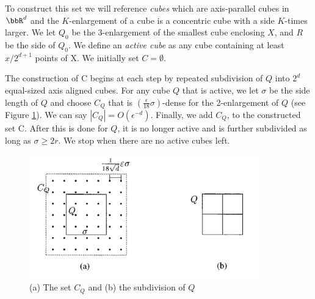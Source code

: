 To construct this set we will reference \emph{cubes} which are axis-parallel cubes in $\bbR^d$ and the $K$-enlargement of a cube is a concentric cube with a side $K$-times larger. We let $Q_0$ be the 3-enlargement of the smallest cube enclosing $X$, and $R$ be the side of $Q_0$. We define an \emph{active cube} as any cube containing at least $x/2^{d+1}$ points of X. We initially set $C = \emptyset$. 

\noindent The construction of C begins at each step by repeated subdivision of $Q$ into $2^d$ equal-sized axis aligned cubes. For any cube $Q$ that is active, we let $\sigma$ be the side length of $Q$ and choose $C_Q$ that is $(\frac{\epsilon }{18} \sigma)$-dense for the 2-enlargement of $Q$ (see Figure \ref{fig:cq}). We can say $|C_Q| = O(\epsilon^{-d})$. Finally, we add $C_Q$, to the constructed set C.  After this is done for $Q$, it is no longer active and is further subdivided as long as $\sigma \geq 2r$. We stop when there are no active cubes left. 

\begin{figure}
    \centering
    \includegraphics[width=10cm]{chapter_1/files/Cq.png}
\centering
    \caption{(a) The set $C_Q$ and (b) the subdivision of $Q$}
    \label{fig:cq}
\end{figure}


